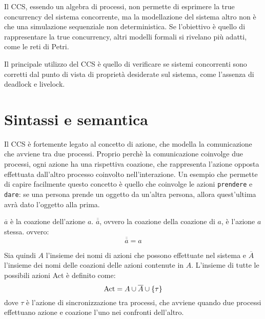 Il CCS, essendo un algebra di processi, non permette di esprimere la true
concurrency del sistema concorrente, ma la modellazione del sistema altro non
è che una simulazione sequenziale non deterministica.
Se l'obiettivo è quello di rappresentare la true concurrency, altri modelli
formali si rivelano più adatti, come le reti di Petri.

Il principale utilizzo del CCS è quello di verificare se sistemi concorrenti
sono corretti dal punto di vista di proprietà desiderate sul sistema, come
l'assenza di deadlock e livelock.

\section{Sintassi e semantica}
Il CCS è fortemente legato al concetto di azione, che modella la comunicazione
che avviene tra due processi. Proprio perchè la comunicazione coinvolge due
processi, ogni azione ha una rispettiva coazione, che rappresenta
l'azione opposta effettuata dall'altro processo coinvolto nell'interazione.
Un esempio che permette di capire facilmente questo concetto è quello
che coinvolge le azioni \verb|prendere| e \verb|dare|: se una persona
prende un oggetto da un'altra persona, allora quest'ultima avrà dato l'oggetto
alla prima.

\begin{rem}
    $\overline{a}$ è la coazione dell'azione $a$. $\overline{\overline{a}}$,
    ovvero la coazione della coazione di $a$, è l'azione $a$ stessa. ovvero:
    \[
        \overline{\overline{a}} = a
    \]
\end{rem}

Sia quindi $A$ l'insieme dei nomi di azioni che possono effettuate nel sistema e
$\overline{A}$ l'insieme dei nomi delle coazioni delle azioni contenute in $A$.
L'insieme di tutte le possibili azioni Act è definito come:
\[
    \text{Act} = A \cup \overline{A} \cup \left\{\tau\right\}
\]
dove $\tau$ è l'azione di sincronizzazione tra processi, che avviene
quando due processi effettuano azione e coazione l'uno nei confronti dell'altro.

